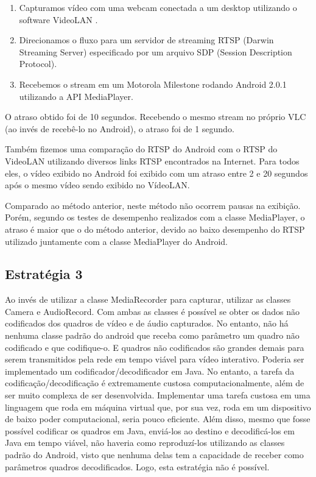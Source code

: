 \documentclass{acm_proc_article-sp}
\begin{document}
\begin{enumerate}
 \item Capturamos vídeo com uma webcam conectada a um desktop utilizando o software VideoLAN .
 \item Direcionamos o fluxo para um servidor de streaming RTSP (Darwin Streaming Server) especificado por um arquivo SDP (Session Description Protocol).
 \item Recebemos o stream em um Motorola Milestone rodando Android 2.0.1 utilizando a API MediaPlayer.
\end{enumerate}

O atraso obtido foi de 10 segundos. Recebendo o mesmo stream no próprio VLC (ao invés de recebê-lo no Android), o atraso foi de 1 segundo.	 	 	

Também fizemos uma comparação do RTSP do Android com o RTSP do VideoLAN utilizando diversos links RTSP encontrados na Internet. Para todos eles, o vídeo exibido no Android foi exibido com um atraso entre 2 e 20 segundos após o mesmo vídeo sendo exibido no VídeoLAN.

Comparado ao método anterior, neste método não ocorrem pausas na exibição. Porém, segundo os testes de desempenho realizados com a classe MediaPlayer, o atraso é maior que o do método anterior, devido ao baixo desempenho do RTSP utilizado juntamente com a classe MediaPlayer do Android.

\subsection{Estratégia 3}

Ao invés de utilizar a classe MediaRecorder para capturar, utilizar as classes Camera e AudioRecord. Com ambas as classes é possível se obter os dados não codificados dos quadros de vídeo e de áudio capturados. No entanto, não há nenhuma classe padrão do android que receba como parâmetro um quadro não codificado e que codifique-o. E quadros não codificados são grandes demais para serem transmitidos pela rede em tempo viável para vídeo interativo. Poderia ser implementado um codificador/decodificador em Java. No entanto, a tarefa da codificação/decodificação é extremamente custosa computacionalmente, além de ser muito complexa de ser desenvolvida. Implementar uma tarefa custosa em uma linguagem que roda em máquina virtual que, por sua vez, roda em um dispositivo de baixo poder computacional, seria pouco eficiente. Além disso, mesmo que fosse possível codificar os quadros em Java, enviá-los ao destino e decodificá-los em Java em tempo viável, não haveria como reproduzí-los utilizando as classes padrão do Android, visto que nenhuma delas tem a capacidade de receber como parâmetros quadros decodificados. Logo, esta estratégia não é possível.
\end{document}
